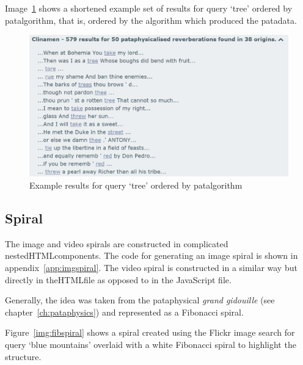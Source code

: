 Image~\ref{img:listalgotree} shows a shortened example set of results for query `tree' ordered by patalgorithm, that is, ordered by the algorithm which produced the patadata.

\begin{figure}[!htbp] %
  \centering
  \includegraphics[width=\linewidth]{images/listalgotree}
\caption[Source result list for query `tree']{Example results for query `tree' ordered by patalgorithm}
\label{img:listalgotree}
\end{figure}


\subsection{Spiral}
\label{s:spiral}

The image and video spirals are constructed in complicated nested\ac{HTML}components. The code for generating an image spiral is shown in appendix~\ref{app:imgspiral}. The video spiral is constructed in a similar way but directly in the\ac{HTML}file as opposed to in the JavaScript file.

Generally, the idea was taken from the pataphysical \emph{grand gidouille} (see chapter~\ref{ch:pataphysics}) and represented as a Fibonacci spiral. 

Figure~\ref{img:fibspiral} shows a spiral created using the Flickr image search for query `blue mountains' overlaid with a white Fibonacci spiral to highlight the structure.

